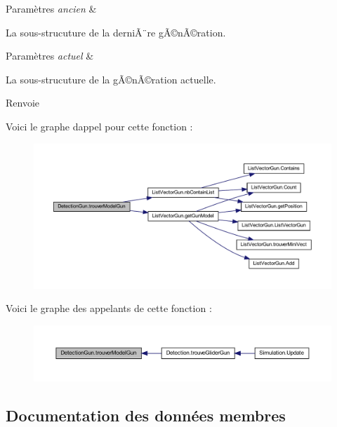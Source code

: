 \begin{DoxyParams}{Paramètres}
{\em ancien} & \\
\hline
\end{DoxyParams}
La sous-\/strucuture de la derniÃ¨re gÃ©nÃ©ration. 
\begin{DoxyParams}{Paramètres}
{\em actuel} & \\
\hline
\end{DoxyParams}
La sous-\/strucuture de la gÃ©nÃ©ration actuelle. \begin{DoxyReturn}{Renvoie}

\end{DoxyReturn}
Voici le graphe d\textquotesingle{}appel pour cette fonction \+:
\nopagebreak
\begin{figure}[H]
\begin{center}
\leavevmode
\includegraphics[width=350pt]{class_detection_gun_aaafe20e9ecbfe9e95e2f36ac49701d3d_cgraph}
\end{center}
\end{figure}
Voici le graphe des appelants de cette fonction \+:
\nopagebreak
\begin{figure}[H]
\begin{center}
\leavevmode
\includegraphics[width=350pt]{class_detection_gun_aaafe20e9ecbfe9e95e2f36ac49701d3d_icgraph}
\end{center}
\end{figure}


\subsection{Documentation des données membres}
\mbox{\label{class_detection_gun_a61b7a92ce8bf0837449e3e98c344ce1c}} 
